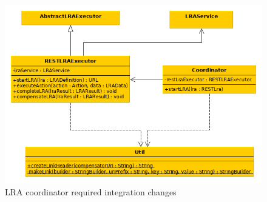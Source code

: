 \documentclass[oneside,
  digital, %
  table,   %
  lof,     %
  lot,     %
]{fithesis3}
\begin{document}
\hfill \break


\begin{figure}[!h]
    \begin{center}
        \includegraphics[trim=3cm 0 0 0,height=0.55\textheight]{images/classDiagrams/lra-coordinator.png}
    \end{center}
    \caption{LRA coordinator required integration changes}
    \label{fig:lra-coordinator-integration-class-diagram}
\end{figure}
\end{document}

